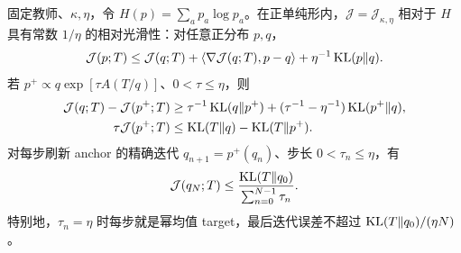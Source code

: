 \begin{theorem}
\label{thm:power-md-relative-smoothness}
固定教师、$\kappa,\eta$，令 $H(p)=\sum_ap_a\log p_a$。在正单纯形内，$\mathcal J=\mathcal J_{\kappa,\eta}$ 相对于 $H$ 具有常数 $1/\eta$ 的相对光滑性：对任意正分布 $p,q$，
\begin{equation}
 \mathcal J(p;T)\le\mathcal J(q;T)+\langle\nabla\mathcal J(q;T),p-q\rangle
       +\eta^{-1}\operatorname{KL}(p\Vert q).
 \label{eq:power-md-relative-smoothness}
\end{equation}
若 $p^+\propto q\exp[\tau A(T/q)]$、$0<\tau\le\eta$，则
\begin{align}
 \mathcal J(q;T)-\mathcal J(p^+;T)
 &\ge\tau^{-1}\operatorname{KL}(q\Vert p^+)
  +(\tau^{-1}-\eta^{-1})\operatorname{KL}(p^+\Vert q),\\
 \tau\mathcal J(p^+;T)
 &\le\operatorname{KL}(T\Vert q)-\operatorname{KL}(T\Vert p^+).
 \label{eq:power-md-single-step-progress}
\end{align}
对每步刷新 anchor 的精确迭代 $q_{n+1}=p^+(q_n)$、步长 $0<\tau_n\le\eta$，有
\begin{equation}
 \mathcal J(q_N;T)\le
 \frac{\operatorname{KL}(T\Vert q_0)}{\sum_{n=0}^{N-1}\tau_n}.
 \label{eq:power-md-last-iterate-rate}
\end{equation}
特别地，$\tau_n=\eta$ 时每步就是幂均值 target，最后迭代误差不超过 $\operatorname{KL}(T\Vert q_0)/(\eta N)$。
\end{theorem}

